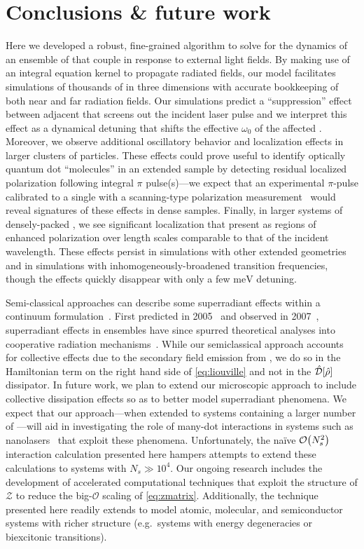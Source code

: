 \section{\label{section:conclusion}Conclusions \& future work}
Here we developed a robust, fine-grained algorithm to solve for the dynamics of an ensemble of \qds{} that couple in response to external light fields.
By making use of an integral equation kernel to propagate radiated fields, our model facilitates simulations of thousands of \qds{} in three dimensions with accurate bookkeeping of both near and far radiation fields.
Our simulations predict a ``suppression'' effect between adjacent \qds{} that screens out the incident laser pulse and we interpret this effect as a dynamical detuning that shifts the effective $\omega_0$ of the affected \qds{}.
Moreover, we observe additional oscillatory behavior and localization effects in larger clusters of particles.
These effects could prove useful to identify optically quantum dot ``molecules'' in an extended sample by detecting residual localized polarization following integral $\pi$ pulse(s)---we expect that an experimental $\pi$-pulse calibrated to a single \qd{} with a scanning-type polarization measurement~\cite{Asakura2013} would reveal signatures of these effects in dense samples.
Finally, in larger systems of densely-packed \qds{}, we see significant localization that present as regions of enhanced polarization over length scales comparable to that of the incident wavelength.
These effects persist in simulations with other extended geometries and in simulations with inhomogeneously-broadened transition frequencies, though the effects quickly disappear with only a few $\si{\milli\eV}$ detuning.

Semi-classical approaches can describe some superradiant effects within a continuum formulation~\cite{Gross1982,PhysRevA.4.302,PhysRevA.4.854}.
First predicted in 2005~\cite{Temnov2005} and observed in 2007~\cite{Scheibner2007}, superradiant effects in \qd{} ensembles have since spurred theoretical analyses into cooperative radiation mechanisms~\cite{Temnov2009,Chen2008}.
While our semiclassical approach accounts for collective effects due to the secondary field emission from \qds{}, we do so in the Hamiltonian term on the right hand side of \cref{eq:liouville} and not in the $\hat{\mathcal{D}}\qty[\hat{\rho}]$ dissipator.
In future work, we plan to extend our microscopic approach to include collective dissipation effects so as to better model superradiant phenomena.
We expect that our approach---when extended to systems containing a larger number of \qds{}---will aid in investigating the role of many-dot interactions in systems such as nanolasers~\cite{jahnke2016giant} that exploit these phenomena.
Unfortunately, the na\"ive $\mathcal{O}\qty(N_s^2)$ interaction calculation presented here hampers attempts to extend these calculations to systems with $N_s \gg 10^4$.
Our ongoing research includes the development of accelerated computational techniques that exploit the structure of $\mathcal{Z}$ to reduce the big-$\mathcal{O}$ scaling of \cref{eq:zmatrix}.
Additionally, the technique presented here readily extends to model atomic, molecular, and semiconductor systems with richer structure (e.g.\ systems with energy degeneracies or biexcitonic transitions).

